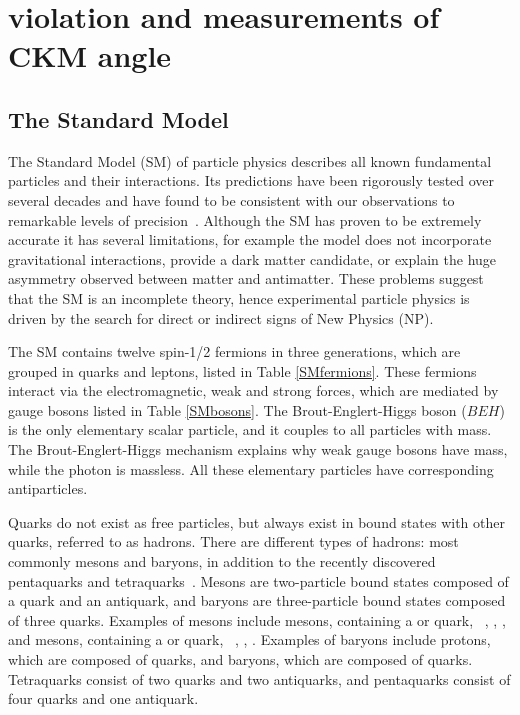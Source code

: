 %

\chapter{\label{ch:2-background}\CP violation and measurements of CKM angle \Pgamma} 


\section{The Standard Model}

The Standard Model (SM) of particle physics describes all known fundamental particles and their interactions. Its predictions have been rigorously tested over several decades and have found to be consistent with our observations to remarkable levels of precision~\cite{SMprecision}. Although the SM has proven to be extremely accurate it has several limitations, for example the model does not incorporate gravitational interactions, provide a dark matter candidate, or explain the huge asymmetry observed between matter and antimatter. These problems suggest that the SM is an incomplete theory, hence experimental particle physics is driven by the search for direct or indirect signs of New Physics (NP).

The SM contains twelve spin-1/2 fermions in three generations, which are grouped in quarks and leptons, listed in Table \ref{SMfermions}. These fermions interact via the electromagnetic, weak and strong forces, which are mediated by gauge bosons listed in Table \ref{SMbosons}. The Brout-Englert-Higgs boson ($BEH$) is the only elementary scalar particle, and it couples to all particles with mass. The Brout-Englert-Higgs mechanism explains why weak gauge bosons have mass, while the photon is massless. All these elementary particles have corresponding antiparticles.

Quarks do not exist as free particles, but always exist in bound states with other quarks, referred to as hadrons. There are different types of hadrons: most commonly mesons and baryons, in addition to the recently discovered pentaquarks and tetraquarks~\cite{pentaquark,tetraquark_BESIII,tetraquark_lhcb}. Mesons are two-particle bound states composed of a quark and an antiquark, and baryons are three-particle bound states composed of three quarks. Examples of mesons include \B mesons, containing a \bquark or \bquarkbar quark, \eg~\Bm, \Bp, \Bz, and \D mesons, containing a \cquark or \cquarkbar quark, \eg~\Dm, \Dp, \Dz. Examples of baryons include protons, which are composed of \uquark\uquark\dquark quarks, and \Lz baryons, which are composed of \uquark\dquark\squark quarks. Tetraquarks consist of two quarks and two antiquarks, and pentaquarks consist of four quarks and one antiquark.

